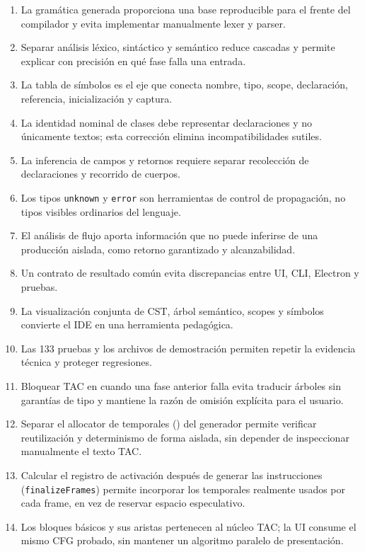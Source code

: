 \documentclass[11pt,letterpaper,oneside]{report}
\newcommand{\archivo}[1]{\path{#1}}
\newcommand{\codigo}[1]{\texttt{#1}}
\begin{document}
\begin{enumerate}
  \item La gramática generada proporciona una base reproducible para el frente del
        compilador y evita implementar manualmente lexer y parser.
  \item Separar análisis léxico, sintáctico y semántico reduce cascadas y permite
        explicar con precisión en qué fase falla una entrada.
  \item La tabla de símbolos es el eje que conecta nombre, tipo, scope, declaración,
        referencia, inicialización y captura.
  \item La identidad nominal de clases debe representar declaraciones y no únicamente
        textos; esta corrección elimina incompatibilidades sutiles.
  \item La inferencia de campos y retornos requiere separar recolección de
        declaraciones y recorrido de cuerpos.
  \item Los tipos \codigo{unknown} y \codigo{error} son herramientas de control de
        propagación, no tipos visibles ordinarios del lenguaje.
  \item El análisis de flujo aporta información que no puede inferirse de una
        producción aislada, como retorno garantizado y alcanzabilidad.
  \item Un contrato de resultado común evita discrepancias entre UI, CLI, Electron y
        pruebas.
  \item La visualización conjunta de CST, árbol semántico, scopes y símbolos convierte
        el IDE en una herramienta pedagógica.
  \item Las 133 pruebas y los archivos de demostración permiten repetir la evidencia
        técnica y proteger regresiones.
  \item Bloquear TAC en \archivo{analyze.ts} cuando una fase anterior falla evita
        traducir árboles sin garantías de tipo y mantiene la razón de omisión
        explícita para el usuario.
  \item Separar el allocator de temporales (\archivo{allocators.ts}) del generador
        permite verificar reutilización y determinismo de forma aislada, sin
        depender de inspeccionar manualmente el texto TAC.
  \item Calcular el registro de activación después de generar las instrucciones
        (\codigo{finalizeFrames}) permite incorporar los temporales realmente usados
        por cada frame, en vez de reservar espacio especulativo.
  \item Los bloques básicos y sus aristas pertenecen al núcleo TAC; la UI consume
        el mismo CFG probado, sin mantener un algoritmo paralelo de presentación.
\end{enumerate}
\end{document}
